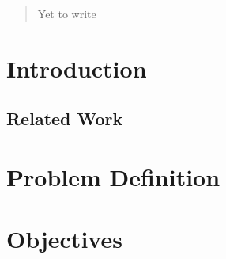 \documentclass[11pt]{article}
\begin{document}
\propportada                        %
\proppagfirmas                      %
\thispagestyle{empty}
\tableofcontents                    %
\newpage
\sloppy
\newpage


\begin{abstract}
Yet to write

\begin{comment}
Normalmente, cuando se presenta un documento de este tipo o un artículo, es
importante incluir un {\it Resumen}, que en alrededor de 200 palabras 
informa al
lector los aspectos más relevantes del trabajo. Esto es de importancia, por
ejemplo, para buscar bibliografía o seleccionar aquellos documentos que en
determinado momento son de interés para alguien.  

Las preguntas a contestar en el Resumen son las siguientes:
\begin{itemize}
	\item ?`Para qué Maestría es la Propuesta?
	\item ?`Cuál es la el contexto y situación problemática en la que se encuentra?
	\item ?`Qué problema particular se piensa resolver? ¿por qué se quiere
	  resolver  y para qué?
	\item ?`Qué se ha hecho antes?
	\item ?`Cómo se piensa resolver?
	\item ?`Qué se espera obtener?
\end{itemize}
\end{comment}
\end{abstract}


\section{Introduction}


\subsection{Related Work}


\section{Problem Definition}


\section{Objectives}

\end{document}
